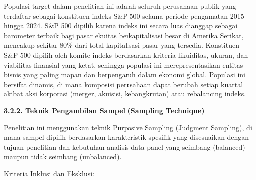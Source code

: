 \documentclass[12pt,a4paper]{report}
\begin{document}
Populasi target dalam penelitian ini adalah seluruh perusahaan publik
yang terdaftar sebagai konstituen indeks S\&P 500 selama periode
pengamatan 2015 hingga 2024. S\&P 500 dipilih karena indeks ini secara
luas dianggap sebagai barometer terbaik bagi pasar ekuitas
berkapitalisasi besar di Amerika Serikat, mencakup sekitar 80\% dari
total kapitalisasi pasar yang tersedia. Konstituen S\&P 500 dipilih oleh
komite indeks berdasarkan kriteria likuiditas, ukuran, dan viabilitas
finansial yang ketat, sehingga populasi ini merepresentasikan entitas
bisnis yang paling mapan dan berpengaruh dalam ekonomi global. Populasi
ini bersifat dinamis, di mana komposisi perusahaan dapat berubah setiap
kuartal akibat aksi korporasi (merger, akuisisi, kebangkrutan) atau
rebalancing indeks.

\textbf{3.2.2. Teknik Pengambilan Sampel (Sampling Technique)}

Penelitian ini menggunakan teknik Purposive Sampling (Judgment
Sampling), di mana sampel dipilih berdasarkan karakteristik spesifik
yang disesuaikan dengan tujuan penelitian dan kebutuhan analisis data
panel yang seimbang (balanced) maupun tidak seimbang (unbalanced).

Kriteria Inklusi dan Eksklusi:
\end{document}
